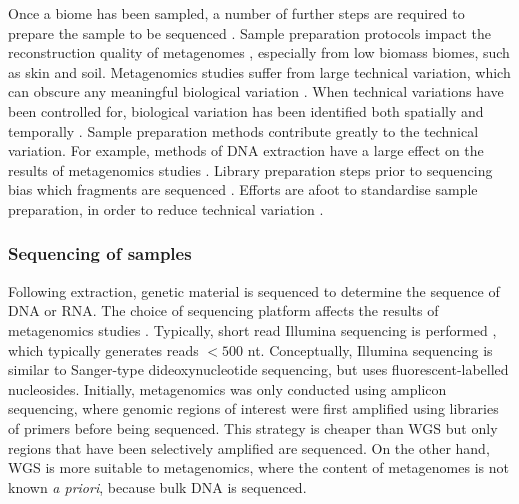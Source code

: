 Once a biome has been sampled, a number of further steps are required to prepare the sample to be sequenced \cite{Bachmann2018,Franzosa2014}. Sample preparation protocols impact the reconstruction quality of metagenomes \cite{Bowers2015}, especially from low biomass biomes, such as skin and soil. Metagenomics studies suffer from large technical variation, which can obscure any meaningful biological variation \cite{Lozupone2013,Voigt2015,Solonenko2013}. When technical variations have been controlled for, biological variation has been identified both spatially and temporally \cite{Raes2008,Voigt2015}. Sample preparation methods contribute greatly to the technical variation. For example, methods of DNA extraction have a large effect on the results of metagenomics studies \cite{Costea2017,Kallies2019}. Library preparation steps prior to sequencing bias which fragments are sequenced \cite{Sato2019}. Efforts are afoot to standardise sample preparation, in order to reduce technical variation \cite{Costea2017}.

\subsubsection{Sequencing of samples}

Following extraction, genetic material is sequenced to determine the sequence of DNA or RNA. The choice of sequencing platform affects the results of metagenomics studies \cite{Solonenko2013,Sevim2019}. Typically, short read Illumina sequencing is performed \cite{Rodrigue2010}, which typically generates reads $<500$ nt. Conceptually, Illumina sequencing is similar to Sanger-type dideoxynucleotide sequencing, but uses fluorescent-labelled nucleosides. Initially, metagenomics was only conducted using amplicon sequencing, where genomic regions of interest were first amplified using libraries of primers before being sequenced. This strategy is cheaper than WGS but only regions that have been selectively amplified are sequenced. On the other hand, WGS is more suitable to metagenomics, where the content of metagenomes is not known \emph{a priori}, because bulk DNA is sequenced.

